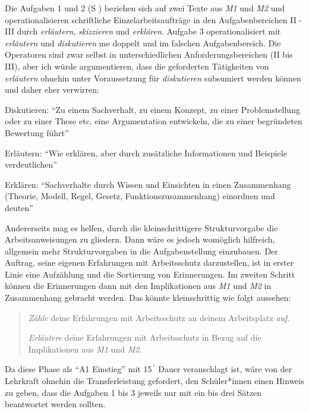 Die Aufgaben 1 und 2 (\gls{S} \pageref{DEMOKRATIE-A1}) beziehen sich auf zwei Texte aus \emph{M1} und \emph{M2} und operationalisieren schriftliche Einzelarbeitsaufträge in den Aufgabenbereichen II - III durch \emph{erläutern}, \emph{skizzieren} und \emph{erklären}.
Aufgabe 3 operationalisiert mit \emph{erläutern} und \emph{diskutieren} \gls{me} doppelt und im falschen Aufgabenbereich. Die Operatoren sind zwar selbst in unterschiedlichen Anforderungsbereichen (II bis III), aber ich würde argumentieren, dass die geforderten Tätigkeiten von \emph{erläutern} ohnehin unter Voraussetzung für \emph{diskutieren} subsumiert werden können und daher eher verwirren:
\begin{myitemize}
    \item Diskutieren: \enquote{Zu einem Sachverhalt, zu einem Konzept, zu einer Problemstellung oder zu einer These etc. eine Argumentation entwickeln, die zu einer begründeten Bewertung führt} 
    \item Erläutern: \enquote{Wie erklären, aber durch zusätzliche Informationen und Beispiele verdeutlichen}
    \item Erklären: \enquote{Sachverhalte durch Wissen und Einsichten in einen Zusammenhang (Theorie, Modell, Regel, Gesetz, Funktionszusammenhang) einordnen und deuten} 

    \autocite[][13-14]{lower2008}
\end{myitemize}
Andererseits mag es helfen, durch die kleinschrittigere Strukturvorgabe die Arbeitsanweisungen zu gliedern. Dann wäre es jedoch womöglich hilfreich, allgemein mehr Strukturvorgaben in die Aufgabenstellung einzubauen. Der Auftrag, seine eigenen Erfahrungen mit Arbeitsschutz darzustellen, ist in erster Linie eine Aufzählung und die Sortierung von Erinnerungen. Im zweiten Schritt können die Erinnerungen dann mit den Implikationen aus \emph{M1} und \emph{M2} in Zusammenhang gebracht werden. 
Das könnte kleinschrittig wie folgt aussehen:
\begin{quote}
    \emph{Zähle} deine Erfahrungen mit Arbeitsschutz an deinem Arbeitsplatz \emph{auf}.

    \emph{Erläutere} deine Erfahrungen mit Arbeitsschutz in Bezug auf die Implikationen aus \emph{M1} und \emph{M2}. 
\end{quote}

Da diese Phase als \enquote{A1 Einstieg} mit 15$\,^{\prime}$ Dauer veranschlagt ist, wäre von der Lehrkraft ohnehin die Transferleistung gefordert, den Schüler*innen einen Hinweis zu geben, dass die Aufgaben 1 bis 3 jeweils nur mit ein bis drei Sätzen beantwortet werden sollten.

